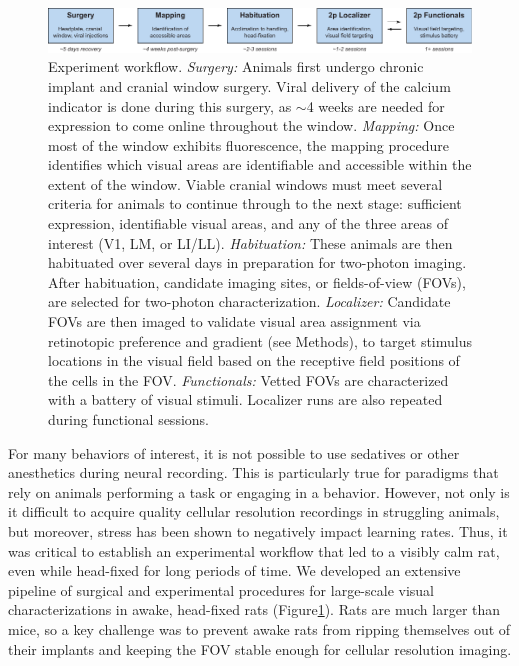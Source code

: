 \begin{figure}[t!]
    \includegraphics[width=\textwidth]{figures/chapter_2/fig_2-2_experiment_workflow/fig_2-2_experiment_workflow.pdf}
    \vspace{.1in}
    \caption[Experiment workflow]{Experiment workflow. 
    \textit{Surgery:} Animals first undergo chronic implant and cranial window surgery. Viral delivery of the calcium indicator is done during this surgery, as $\sim$4 weeks are needed for expression to come online throughout the window.
    \textit{Mapping:} Once most of the window exhibits fluorescence, the mapping procedure identifies which visual areas are identifiable and accessible within the extent of the window. Viable cranial windows must meet several criteria for animals to continue through to the next stage: sufficient expression, identifiable visual areas, and any of the three areas of interest (V1, LM, or LI/LL). \textit{Habituation:} These animals are then habituated over several days in preparation for two-photon imaging. After habituation, candidate imaging sites, or fields-of-view (FOVs), are selected for two-photon characterization. \textit{Localizer:} Candidate FOVs are then imaged to validate visual area assignment via retinotopic preference and gradient (see Methods), to target stimulus locations in the visual field based on the receptive field positions of the cells in the FOV. 
    \textit{Functionals:} Vetted FOVs are characterized with a battery of visual stimuli. Localizer runs are also repeated during functional sessions. 
    \label{fig:experiment_workflow}}
\end{figure}

For many behaviors of interest, it is not possible to use sedatives or other anesthetics during neural recording. This is particularly true for paradigms that rely on animals performing a task or engaging in a behavior. However, not only is it difficult to acquire quality cellular resolution recordings in struggling animals, but moreover, stress has been shown to negatively impact learning rates\cite{REFREF}. Thus, it was critical to establish an experimental workflow that led to a visibly calm rat, even while head-fixed for long periods of time. We developed an extensive pipeline of surgical and experimental procedures for large-scale visual characterizations in awake, head-fixed rats (Figure\ref{fig:experiment_workflow}). Rats are much larger than mice, so a key challenge was to prevent awake rats from ripping themselves out of their implants and keeping the FOV stable enough for cellular resolution imaging. 

